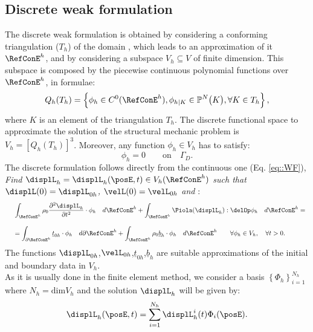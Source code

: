 \subsection{Discrete weak formulation}
\label{sct-DiscreteWF}
The discrete weak formulation is obtained by considering a conforming triangulation ($T_h$) of the domain \RefCon, which leads to an approximation of it $\RefConE^h$, and by considering a subspace $V_h\subseteq V$ of finite dimension. This subspace is composed by the piecewise continuous polynomial functions over $\RefConE^h$, in formulae:
\begin{equation}
  Q_h(T_h)=\left\{\phi_h \in C^0(\RefConE^h), \phi_{h|K} \in \mathbb{P}^N\big(K\big), \forall K \in T_h\right\},
  \label{eq::SpaceDiscrete}
\end{equation} 
where $K$ is an element of the triangulation $T_h$. The discrete functional space to approximate the solution of the structural mechanic problem is $V_h=\left[Q_h(T_h)\right]^3$. Moreover, any function $\phi_h\in V_h$ has to satisfy:
\begin{displaymath}
  \phi_h=0 \qquad \text{on}\quad\Gamma_D.
\end{displaymath}
The discrete formulation follows directly from the continuous one (Eq. \eqref{eq::WF}),\\
\textit{Find $\displL_h=\displL_h(\posE,t)\in V_h(\RefConE^h)$ such that $\displL(0)=\displL_{0h}$, $\velL(0)=\velL_{0h}$ and} :
\begin{equation}
  \begin{array}{lll}
    & \displaystyle \int_{\RefConE^h}\rho_0\frac{\partial^2 \displL_h}{\partial t^2}\cdot\phi_h\quad d\RefConE^h  + \int_{\RefConE^h}\Piola(\displL_h):\delOp\phi_h\quad d\RefConE^h = \\
    \\
    & \displaystyle = \int_{\partial \RefConE^h}\underline{t}_{0h}\cdot\phi_h\quad d\partial\RefConE^h + \int_{\RefConE^h}\rho_0 \underline{b}_h\cdot\phi_h\quad d\RefConE^h \qquad \forall \phi_h\in V_h, \quad \forall t>0.
    \end{array}
  \label{eq::DWF}
\end{equation}
The functions $\displL_{0h}$,$\velL_{0h}$,$\underline{t}_{0h}$,$\underline{b}_h$ are suitable approximations of the initial and boundary data in $V_h$.\\
As it is usually done in the finite element method, we consider a basis $\left\{\Phi_h\right\}_{i=1}^{N_h}$ where $N_h=\text{dim}V_h$  and the solution $\displL_h$ will be given by:
\begin{equation}
  \displaystyle \displL_h(\posE,t)= \sum_{i=1}^{N_h}\displL_h^i(t)\Phi_i(\posE).
  \label{eq::DiscreteSolution}
\end{equation}
